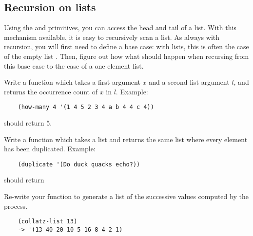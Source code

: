 \documentclass{../../../tp}
\begin{document}
\subsection{Recursion on lists}

Using the \car and \cdr primitives, you can access the head and tail of a list. With this mechanism available, it is easy to recursively scan a list. As always with recursion, you will first need to define a base case: with lists, this is often the case of the empty list . Then, figure out how what should happen when recursing from this base case to the case of a one element list.

\begin{instruction}	
	Write a function  which takes a first argument $x$ and a second list argument $l$, and returns the occurrence count of $x$ in $l$. Example:
	
	\begin{verbatim}
	(how-many 4 '(1 4 5 2 3 4 a b 4 4 c 4))
	\end{verbatim}
	
	should return 5.
\end{instruction}

\begin{instruction}	
	Write a function  which takes a list and returns the same list where every element has been duplicated. Example:
	
	\begin{verbatim}
	(duplicate '(Do duck quacks echo?))
	\end{verbatim}
	
	should return 
\end{instruction}


\begin{instruction}	
	Re-write your  function to generate a list of the successive values computed by the process. 
	
	\begin{verbatim}
	(collatz-list 13)
	-> '(13 40 20 10 5 16 8 4 2 1)
	\end{verbatim}
\end{instruction}
\end{document}
